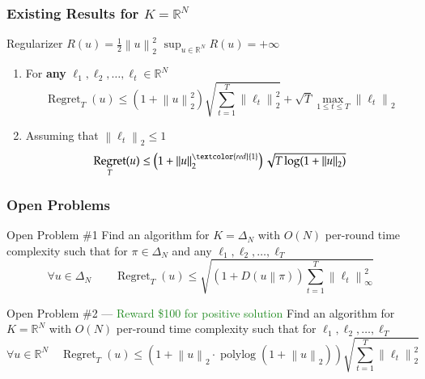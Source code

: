\documentclass[usenames,dvipsnames]{beamer}
\DeclareMathOperator{\Regret}{Regret}
\DeclareMathOperator{\polylog}{polylog}
\newcommand{\R}{\mathbb{R}}
\newcommand{\norm}[1]{\left\|#1\right\|}
\newcommand{\KL}[2]{D\left({#1}\middle\|{#2}\right)}
\newcommand{\Cite}[1]{{\tiny \textcolor{Blue}{[#1]}}}
\begin{document}
\begin{frame}
\frametitle{Existing Results for $K=\R^N$}

Regularizer $R(u) = \frac{1}{2}\norm{u}_2^2$ \qquad $\sup_{u \in \R^N} R(u) = +\infty$

\vspace{1cm}

\begin{enumerate}

\item For \textbf{any} $\ell_1, \ell_2, \dots, \ell_t \in \R^N$ \qquad \Cite{OP'15}
$$
\Regret_T(u) \le \left( 1+\norm{u}_2^2 \right) \sqrt{\sum_{t=1}^T \norm{\ell_t}_2^2} + \sqrt{T} \max_{1 \le t \le T} \norm{\ell_t}_2
$$

\item Assuming that $\norm{\ell_t}_2 \le 1$ \qquad \Cite{SM'12, O'13, MA'13, MO'14, O'14, OP'16}
$$
\Regret_T(u) \le \left( 1 + \norm{u}_2^{\textcolor{red}{1}} \right) \sqrt{T \log(1+\norm{u}_2)}
$$
\end{enumerate}
\end{frame}

\begin{frame}
\frametitle{Open Problems}

\begin{block}{Open Problem \#1}
Find an algorithm for $K=\Delta_N$ with $O(N)$ per-round time complexity
such that for  $\pi \in \Delta_N$ and any $\ell_1, \ell_2, \dots, \ell_T$
$$
\forall u \in \Delta_N \qquad
\Regret_T(u) \le \sqrt{\left(1 + \KL{u}{\pi}\right) \sum_{t=1}^T \norm{\ell_t}_\infty^2}
$$
\end{block}

\begin{block}{Open Problem \#2 --- \textcolor{ForestGreen}{Reward \$100 for positive solution}}
Find an algorithm for $K=\R^N$ with $O(N)$ per-round time complexity
such that for  $\ell_1, \ell_2, \dots, \ell_T$
$$
\forall u \in \R^N \quad
\Regret_T(u) \le (1 + \norm{u}_2 \cdot \polylog(1+\norm{u}_2)) \sqrt{\sum_{t=1}^T \norm{\ell_t}_2^2}
$$
\end{block}
\end{frame}
\end{document}

